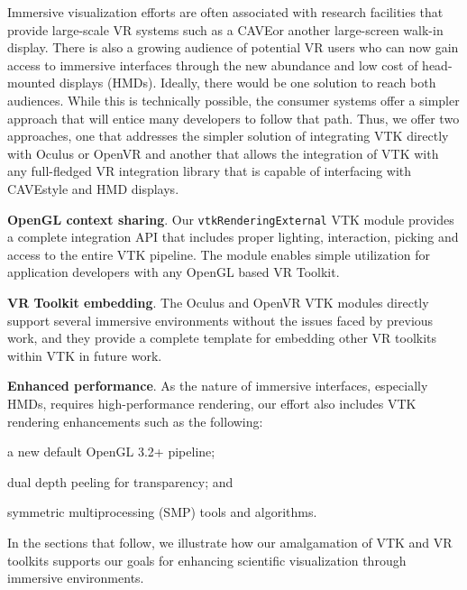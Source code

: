 Immersive visualization efforts are often associated with research
facilities that provide large-scale VR systems such as a CAVE\texttrademark or
another large-screen walk-in display.
There is also a growing audience of potential VR users who can now
gain access to immersive interfaces through the new abundance and low cost
of head-mounted displays (HMDs).
Ideally, there would be one solution to reach both audiences. While this is
technically possible, the consumer systems offer a simpler
approach that will entice many developers to follow that path.
Thus, we offer two approaches, one that addresses the simpler solution
of integrating VTK directly with Oculus or OpenVR and another that allows the integration of VTK with
any full-fledged VR integration library that is capable of interfacing
with CAVE\texttrademark style and HMD displays.

\textbf{OpenGL context sharing}.
Our \texttt{vtkRenderingExternal} VTK module provides a complete integration API
that includes proper lighting, interaction, picking and access to the entire
VTK pipeline.
The module enables simple utilization for application developers with
any OpenGL based VR Toolkit.

\textbf{VR Toolkit embedding}.
The Oculus and OpenVR VTK modules directly support several immersive environments
without the issues faced by previous work, and they provide a complete template
for embedding other VR toolkits within VTK in future work.

\textbf{Enhanced performance}.
As the nature of immersive interfaces, especially HMDs, requires
high-performance rendering, our effort also includes VTK rendering enhancements
such as the following:

\begin{compactitem}
\item a new default OpenGL 3.2+ pipeline;
\item dual depth peeling for transparency; and 
\item symmetric multiprocessing (SMP) tools and algorithms.
\end{compactitem}

In the sections that follow, we illustrate how our amalgamation of VTK and VR toolkits supports our goals for enhancing scientific visualization through immersive environments.

